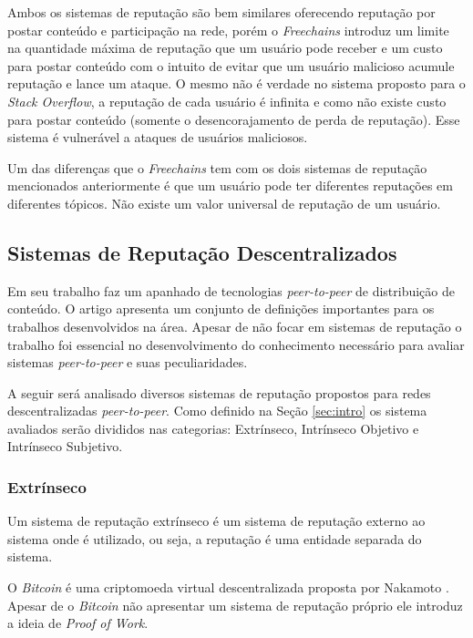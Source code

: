 \documentclass[12pt]{article}
\newcommand{\FC} {\emph{Freechains}\xspace}
\newcommand{\PtoP} {\emph{peer-to-peer}\xspace}
\begin{document}
Ambos os sistemas de reputação são bem similares oferecendo reputação por postar conteúdo e participação na rede, porém o \FC introduz um limite na quantidade máxima de reputação que um usuário pode receber e um custo para postar conteúdo com o intuito de evitar que um usuário malicioso acumule reputação e lance um ataque. 
O mesmo não é verdade no sistema proposto para o \emph{Stack Overflow}, a reputação de cada usuário é infinita e como não existe custo para postar conteúdo (somente o desencorajamento de perda de reputação). 
Esse sistema é vulnerável a ataques de usuários maliciosos.

Um das diferenças que o \FC tem com os dois sistemas de reputação mencionados anteriormente é que um usuário pode ter diferentes reputações em diferentes tópicos. 
Não existe um valor universal de reputação de um usuário.  

\subsection{Sistemas de Reputação Descentralizados} \label{subsec:SRDescen}

Em seu trabalho \cite{10.1145/1041680.1041681} faz um apanhado de tecnologias \PtoP de distribuição de conteúdo. 
O artigo apresenta um conjunto de definições importantes para os trabalhos desenvolvidos na área. 
Apesar de não focar em sistemas de reputação o trabalho foi essencial no desenvolvimento do conhecimento necessário para avaliar sistemas \PtoP e suas peculiaridades.

A seguir será analisado diversos sistemas de reputação propostos para redes descentralizadas \PtoP. 
Como definido na Seção \ref{sec:intro} os sistema avaliados serão divididos nas categorias: Extrínseco, Intrínseco Objetivo e Intrínseco Subjetivo.

\subsubsection{Extrínseco} \label{subsub:extr}

Um sistema de reputação extrínseco é um sistema de reputação externo ao sistema onde é utilizado, ou seja, a reputação é uma entidade separada do sistema.

O \emph{Bitcoin} é uma criptomoeda virtual descentralizada proposta por Nakamoto \cite{nakamoto2008peer}. 
Apesar de o \emph{Bitcoin} não apresentar um sistema de reputação próprio ele introduz a ideia de \emph{Proof of Work}. 
\end{document}
